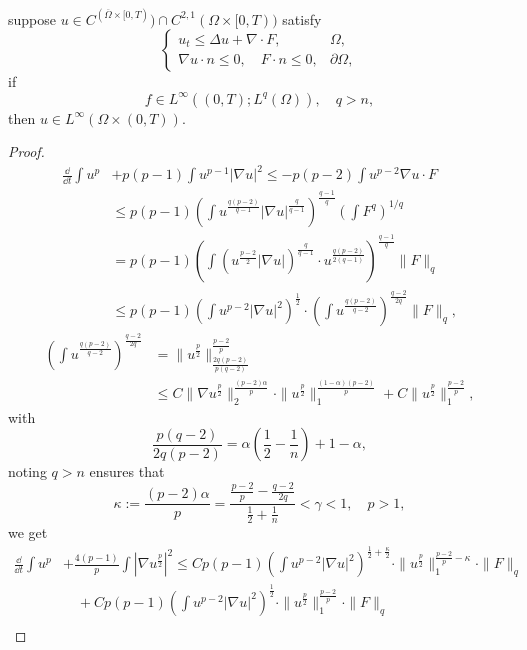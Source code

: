 \begin{lemma}
	suppose $u\in C^(\overline{\Omega}\times[0,T))\cap C^{2,1}(\Omega\times[0,T))$ satisfy 
\begin{equation*}
	\begin{cases}
		u_t \leq \Delta u + \nabla\cdot F, & \Omega,\\
		\nabla u\cdot n \leq 0, \quad F\cdot n \leq 0, & \partial\Omega,
	\end{cases}
\end{equation*}
if 
\[
	f\in L^\infty((0,T); L^q(\Omega)),\quad q>n,
\]
then
$u\in L^\infty(\Omega\times(0,T))$.
\end{lemma}
\begin{proof}
	\begin{align*}
		\frac{\dd}{\dd t}\int u^p &+ p(p-1)\int u^{p-1}|\nabla u|^2 
		\leq - p(p-2)\int u^{p-2}\nabla u\cdot F\\
		&\leq p(p-1)\left(\int u^{\frac{q(p-2)}{q-1}}|\nabla u|^{\frac{q}{q-1}}\right)^{\frac{q-1}{q}}
			\left(\int F^q\right)^{1/q}\\
		&= p(p-1)\left(\int \left(u^{\frac{p-2}{2}}|\nabla u|\right)^{\frac{q}{q-1}}
			\cdot u^{\frac{q(p-2)}{2(q-1)}}\right)^{\frac{q-1}{q}}\|F\|_q\\
		&\leq p(p-1)\left(\int u^{p-2}|\nabla u|^2\right)^{\frac12}
			\cdot\left(\int u^{\frac{q(p-2)}{q-2}}\right)^{\frac{q-2}{2q}}\|F\|_q,
	\end{align*}
	\begin{align*}
		\left(\int u^{\frac{q(p-2)}{q-2}}\right)^{\frac{q-2}{2q}}
		&= \|u^{\frac{p}{2}}\|_{\frac{2q(p-2)}{p(q-2)}}^{\frac{p-2}{p}}\\
		&\leq C\|\nabla u^{\frac{p}{2}}\|_2^{\frac{(p-2)\alpha}{p}}\cdot\|u^{\frac{p}{2}}\|_1^{\frac{(1-\alpha)(p-2)}{p}} + C\|u^{\frac{p}{2}}\|_1^{\frac{p-2}{p}},
	\end{align*}
	with 
	\[
		\frac{p(q-2)}{2q(p-2)} = \alpha\left(\frac12-\frac1n\right) + 1-\alpha,
	\]
	noting $q>n$ ensures that
	\[
		\kappa := \frac{(p-2)\alpha}{p} = \frac{\frac{p-2}{p}-\frac{q-2}{2q}}{\frac12+\frac1n} <\gamma < 1,
		\quad p > 1,
	\]
	we get
	\begin{align*}
		\frac{\dd}{\dd t}\int u^p &+ \frac{4(p-1)}{p}\int |\nabla u^{\frac{p}{2}}|^2
		\leq Cp(p-1)\left(\int u^{p-2}|\nabla u|^2\right)^{\frac12+\frac\kappa2}\cdot\|u^{\frac{p}{2}}\|_1^{\frac{p-2}{p} - \kappa}\cdot\|F\|_q \\
		&\quad +Cp(p-1) \left(\int u^{p-2}|\nabla u|^2\right)^{\frac12}\cdot\|u^{\frac{p}{2}}\|_1^{\frac{p-2}{p}}\cdot\|F\|_q \\

\end{align*}
\end{proof}
